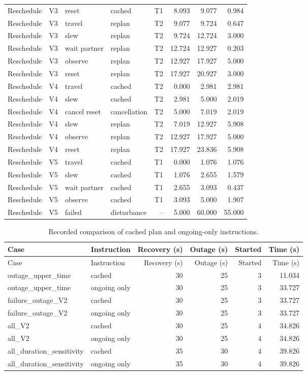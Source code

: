 \begin{longtable}{@{}lcllrrrr@{}}
Reschedule & V3 & reset & cached & T1 & 8.093 & 9.077 & 0.984\\
Reschedule & V3 & travel & replan & T2 & 9.077 & 9.724 & 0.647\\
Reschedule & V3 & slew & replan & T2 & 9.724 & 12.724 & 3.000\\
Reschedule & V3 & wait partner & replan & T2 & 12.724 & 12.927 & 0.203\\
Reschedule & V3 & observe & replan & T2 & 12.927 & 17.927 & 5.000\\
Reschedule & V3 & reset & replan & T2 & 17.927 & 20.927 & 3.000\\
Reschedule & V4 & travel & cached & T2 & 0.000 & 2.981 & 2.981\\
Reschedule & V4 & slew & cached & T2 & 2.981 & 5.000 & 2.019\\
Reschedule & V4 & cancel reset & cancellation & T2 & 5.000 & 7.019 & 2.019\\
Reschedule & V4 & slew & replan & T2 & 7.019 & 12.927 & 5.908\\
Reschedule & V4 & observe & replan & T2 & 12.927 & 17.927 & 5.000\\
Reschedule & V4 & reset & replan & T2 & 17.927 & 23.836 & 5.908\\
Reschedule & V5 & travel & cached & T1 & 0.000 & 1.076 & 1.076\\
Reschedule & V5 & slew & cached & T1 & 1.076 & 2.655 & 1.579\\
Reschedule & V5 & wait partner & cached & T1 & 2.655 & 3.093 & 0.437\\
Reschedule & V5 & observe & cached & T1 & 3.093 & 5.000 & 1.907\\
Reschedule & V5 & failed & disturbance & -- & 5.000 & 60.000 & 55.000\\
\end{longtable}
\begin{longtable}{@{}p{.28\linewidth}lrrrr@{}}
\caption{Recorded comparison of cached plan and ongoing-only instructions.}\\
\toprule
Case & Instruction & Recovery (s) & Outage (s) & Started & Time (s)\\
\midrule
\endfirsthead
\toprule
Case & Instruction & Recovery (s) & Outage (s) & Started & Time (s)\\
\midrule
\endhead
\bottomrule
\endlastfoot
outage\_upper\_time & cached & 30 & 25 & 3 & 11.034\\
outage\_upper\_time & ongoing only & 30 & 25 & 3 & 33.727\\
failure\_outage\_V2 & cached & 30 & 25 & 3 & 33.727\\
failure\_outage\_V2 & ongoing only & 30 & 25 & 3 & 33.727\\
all\_V2 & cached & 30 & 25 & 4 & 34.826\\
all\_V2 & ongoing only & 30 & 25 & 4 & 34.826\\
all\_duration\_sensitivity & cached & 35 & 30 & 4 & 39.826\\
all\_duration\_sensitivity & ongoing only & 35 & 30 & 4 & 39.826\\
\end{longtable}
